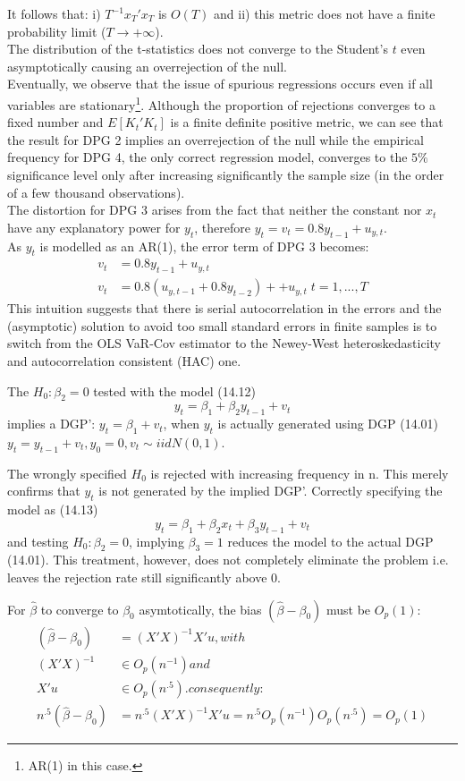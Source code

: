 \documentclass[]{article}
\begin{document}
It follows that: i) $T^{-1}x_{T}'x_{T}$ is $O(T)$ and ii) this metric does not have a finite probability limit ($T \to + \infty$). \\
The distribution of the t-statistics does not converge to the Student's $t$ even asymptotically causing an overrejection of the null.\\
Eventually, we observe that the issue of spurious regressions occurs even if all variables are stationary\footnote{AR(1) in this case.}.
Although the proportion of rejections converges to a fixed number and $E[K_{t}'K_{t}]$ is a finite definite positive metric, we can see that the result for DPG 2 implies an overrejection of the null while the empirical frequency for DPG 4, the only correct regression model, converges to the $5\%$ significance level only after increasing significantly the sample size (in the order of a few thousand observations). \\  
The distortion for DPG 3 arises from the fact that neither the constant nor $x_t$ have any explanatory power for $y_t$, therefore $y_t = v_t = 0.8y_{t-1}+u_{y,t}$.\\ As $y_t$ is modelled as an AR(1), the error term of DPG 3 becomes:
\begin{align*}
	v_t &= 0.8y_{t-1}+u_{y,t} \\
	v_t &= 0.8(u_{y,t-1} + 0.8y_{t-2}) + +u_{y,t} \; t=1,...,T
\end{align*}
This intuition suggests that there is serial autocorrelation in the errors and the (asymptotic) solution to avoid too small standard errors in finite samples is to switch from the OLS VaR-Cov estimator to the Newey-West heteroskedasticity and autocorrelation consistent (HAC) one.



The $H_0: \beta_2=0$ tested with the model (14.12) $$y_t = \beta_1 + \beta_2y_{t-1} + v_t$$ implies a DGP': $y_t = \beta_1 + v_t$, when $y_t$ is actually generated using DGP (14.01) $y_t = y_{t-1} + v_t, y_0=0, v_t \sim iidN(0,1)$.

The wrongly specified $H_0$ is rejected with increasing frequency in n. This merely confirms that $y_t$ is not generated by the implied DGP'. Correctly specifying the model as (14.13) $$y_t = \beta_1 + \beta_2 x_t + \beta_3 y_{t-1} + v_t$$ and testing $H_0:\beta_2=0$, implying $\beta_3=1$ reduces the model to the actual DGP (14.01). This treatment, however, does not completely eliminate the problem i.e. leaves the rejection rate still significantly above 0.

For $\hat{\beta}$ to converge to $\beta_0$ asymtotically, the bias $(\hat{\beta} - \beta_0)$ must be $O_p(1)$: \begin{align*}
	(\hat{\beta} - \beta_0) &= (X'X)^{-1}X'u, with\\
	(X'X)^{-1} &\in O_p(n^{-1}) and \\
	X'u &\in O_p(n^{.5}). consequently:\\
	n^{.5}(\hat{\beta} - \beta_0) &= n^{.5}(X'X)^{-1}X'u = n^{.5} O_p(n^{-1})O_p(n^{.5}) = O_p(1)
\end{align*}
\end{document}
